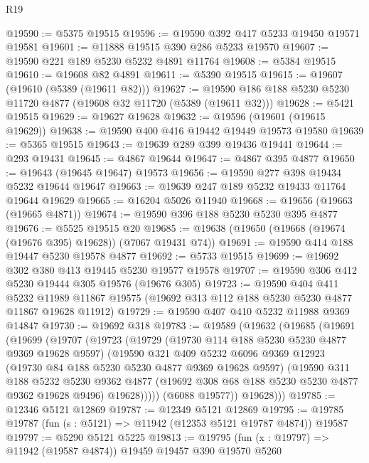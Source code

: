 \begin{lexlean}{R19}
\begin{coremodule}
@19590 := @5375 @19515
@19596 := @19590 @392 @417 @5233 @19450 @19571 @19581
@19601 := @11888 @19515 @390 @286 @5233 @19570
@19607 := @19590 @221 @189 @5230 @5232 @4891 @11764
@19608 := @5384 @19515
@19610 := @19608 @82 @4891
@19611 := @5390 @19515
@19615 := @19607 (@19610 (@5389 (@19611 @82)))
@19627 := @19590 @186 @188 @5230 @5230 @11720 @4877 (@19608 @32 @11720 (@5389 (@19611 @32)))
@19628 := @5421 @19515
@19629 := @19627 @19628
@19632 := @19596 (@19601 (@19615 @19629))
@19638 := @19590 @400 @416 @19442 @19449 @19573 @19580
@19639 := @5365 @19515
@19643 := @19639 @289 @399 @19436 @19441
@19644 := @293 @19431
@19645 := @4867 @19644
@19647 := @4867 @395 @4877
@19650 := @19643 (@19645 @19647) @19573
@19656 := @19590 @277 @398 @19434 @5232 @19644 @19647
@19663 := @19639 @247 @189 @5232 @19433 @11764 @19644 @19629
@19665 := @16204 @5026 @11940
@19668 := @19656 (@19663 (@19665 @4871))
@19674 := @19590 @396 @188 @5230 @5230 @395 @4877
@19676 := @5525 @19515 @20
@19685 := @19638 (@19650 (@19668 (@19674 (@19676 @395) @19628)) (@7067 @19431 @74))
@19691 := @19590 @414 @188 @19447 @5230 @19578 @4877
@19692 := @5733 @19515
@19699 := @19692 @302 @380 @413 @19445 @5230 @19577 @19578
@19707 := @19590 @306 @412 @5230 @19444 @305 @19576 (@19676 @305)
@19723 := @19590
    @404
    @411
    @5232
    @11989
    @11867
    @19575
    (@19692 @313 @112 @188 @5230 @5230 @4877 @11867 @19628 @11912)
@19729 := @19590 @407 @410 @5232 @11988 @9369 @14847
@19730 := @19692 @318
@19783 := @19589
    (@19632
      (@19685
        (@19691
          (@19699
            (@19707
              (@19723
                (@19729
                  (@19730 @114 @188 @5230 @5230 @4877 @9369 @19628 @9597)
                  (@19590
                    @321
                    @409
                    @5232
                    @6096
                    @9369
                    @12923
                    (@19730 @84 @188 @5230 @5230 @4877 @9369 @19628 @9597)
                    (@19590
                      @311
                      @188
                      @5232
                      @5230
                      @9362
                      @4877
                      (@19692 @308 @68 @188 @5230 @5230 @4877 @9362 @19628 @9496)
                      @19628)))))
            (@6088 @19577))
          @19628)))
@19785 := @12346 @5121 @12869
@19787 := @12349 @5121 @12869
@19795 := @19785 @19787 (fun (s : @5121) => @11942 (@12353 @5121 @19787 @4874)) @19587
@19797 := @5290 @5121 @5225
@19813 := @19795
    (fun (x : @19797) => @11942 (@19587 @4874))
    @19459
    @19457
    @390
    @19570
    @5260

\end{coremodule}
\end{lexlean}
